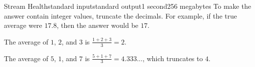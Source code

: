 \begin{problem}{Stream Health}{standard input}{standard output}{1 second}{256 megabytes}
To make the answer contain integer values, truncate the decimals. For example, if the true average were $17.8$, then the answer would be $17$.

\Example

\begin{example}
%
\end{example}

\Note
The average of $1$, $2$, and $3$ is $\frac{1+2+3}{3}=2$.


The average of $5$, $1$, and $7$ is $\frac{5+1+7}{3}=4.333...$, which truncates to $4$.

\end{problem}

